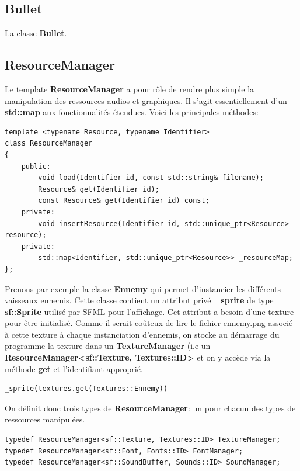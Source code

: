 \documentclass{article}
\begin{document}
\subsection{Bullet}

La classe \textbf{Bullet}.


\subsection{ResourceManager}

Le template \textbf{ResourceManager} a pour rôle de rendre plus simple la manipulation des ressources audios et graphiques. Il s'agit essentiellement d'un \textbf{std::map} aux fonctionnalités étendues. Voici les principales méthodes:

\begin{verbatim} 
template <typename Resource, typename Identifier>
class ResourceManager
{
    public:
        void load(Identifier id, const std::string& filename);
        Resource& get(Identifier id);
        const Resource& get(Identifier id) const;
    private:
        void insertResource(Identifier id, std::unique_ptr<Resource> resource);
    private:
        std::map<Identifier, std::unique_ptr<Resource>>	_resourceMap;
};
\end{verbatim}



Prenons par exemple la classe \textbf{Ennemy} qui permet d'instancier les différents vaisseaux ennemis. Cette classe contient un attribut privé \textbf{\_sprite} de type \textbf{sf::Sprite} utilisé par SFML pour l'affichage. Cet attribut a besoin d'une texture pour être initialisé. Comme il serait coûteux de lire le fichier ennemy.png associé à cette texture à chaque instanciation d'ennemis, on stocke au démarrage du programme la texture dans un \textbf{TextureManager} (i.e un \textbf{ResourceManager<sf::Texture, Textures::ID>} et on y accède via la méthode \textbf{get} et l'identifiant approprié.

\begin{verbatim} 
_sprite(textures.get(Textures::Ennemy))
\end{verbatim}

On définit donc trois types de \textbf{ResourceManager}: un pour chacun des types de ressources manipulées.


\begin{verbatim} 
typedef ResourceManager<sf::Texture, Textures::ID> TextureManager;
typedef ResourceManager<sf::Font, Fonts::ID> FontManager;
typedef ResourceManager<sf::SoundBuffer, Sounds::ID> SoundManager;
\end{verbatim}
\end{document}
